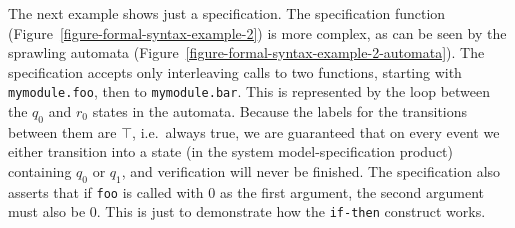 The next example shows just a specification. The specification function
(Figure~\ref{figure-formal-syntax-example-2}) is more complex, as can be seen
by the sprawling automata
(Figure~\ref{figure-formal-syntax-example-2-automata}). The specification
accepts only interleaving calls to two functions, starting with
\texttt{mymodule.foo}, then to \texttt{mymodule.bar}. This is represented by
the loop between the $q_0$ and $r_0$ states in the automata. Because the labels
for the transitions between them are $\top$, i.e.\ always true, we are
guaranteed that on every event we either transition into a state (in the system
model-specification product) containing $q_0$ or $q_1$, and verification
will never be finished. The specification also asserts that if \texttt{foo} is
called with $0$ as the first argument, the second argument must also be $0$.
This is just to demonstrate how the \texttt{if-then} construct works.



